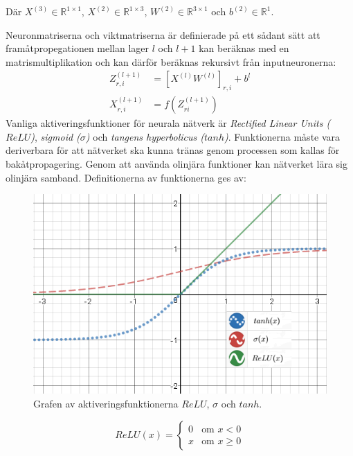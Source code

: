 \documentclass[a4paper,11pt,twoside]{article}
\begin{document}
Där $X^{(3)} \in \mathbb{R}^{1 \times 1}$, $X^{(2)} \in \mathbb{R}^{1 \times 3}$, $W^{(2)} \in \mathbb{R}^{3 \times 1}$ och $b^{(2)} \in \mathbb{R}^{1}$.

Neuronmatriserna och viktmatriserna är definierade på ett sådant sätt att framåtpropegationen mellan lager $l$ och $l+1$ kan beräknas med en matrismultiplikation och kan därför beräknas rekursivt från inputneuronerna: \cite{cs231n} \cite{wikiStanford}
\begin{align}\label{feed-forward}
Z_{r,i}^{(l+1)} & = [X^{(l)}W^{(l)}]_{r,i}+b^{l}\\
X_{r,i}^{(l+1)} & = f(Z_{ri}^{(l+1)})
\end{align}
Vanliga aktiveringsfunktioner för neurala nätverk är \textit{Rectified Linear Units ($ReLU$)}, \textit{sigmoid ($\sigma$)} och \textit{tangens hyperbolicus ($tanh$)}. Funktionerna måste vara deriverbara för att nätverket ska kunna tränas genom processen som kallas för bakåtpropagering. Genom att använda olinjära funktioner kan nätverket lära sig olinjära samband. Definitionerna av funktionerna ges av: \cite{cs231n} 

\begin{figure}[h]\label{aktiveringsfunktion}
	\centering
  		\includegraphics[scale=0.83]{activationfunction.png}
  	\caption{Grafen av aktiveringsfunktionerna $ReLU$, $\sigma$ och $tanh$.}
\end{figure}

\begin{equation}
ReLU(x) = \begin{cases} 
			0 & \mbox{om } x < 0 \\ 
			x & \mbox{om } x \geq 0 
		\end{cases}
\end{equation}
\end{document}
